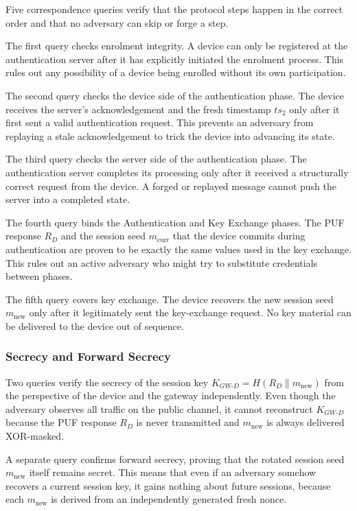 \documentclass[conference]{IEEEtran}
\begin{document}
Five correspondence queries verify that the protocol steps happen in the correct
order and that no adversary can skip or forge a step.

The first query checks enrolment integrity.  A device can only be registered at
the authentication server after it has explicitly initiated the enrolment
process.  This rules out any possibility of a device being enrolled without
its own participation.

The second query checks the device side of the authentication phase.  The device
receives the server's acknowledgement and the fresh timestamp $ts_2$ only after
it first sent a valid authentication request.  This prevents an adversary from
replaying a stale acknowledgement to trick the device into advancing its state.

The third query checks the server side of the authentication phase.  The authentication
server completes its processing only after it received a structurally correct
request from the device.  A forged or replayed message cannot push the server
into a completed state.

The fourth query binds the Authentication and Key Exchange phases.  The PUF response $R_D$ and
the session seed $m_{\mathrm{curr}}$ that the device commits during authentication are proven to be
exactly the same values used in the key exchange.  This rules out an active
adversary who might try to substitute credentials between phases.

The fifth query covers key exchange.  The device recovers the new session seed
$m_{\mathrm{new}}$ only after it legitimately sent the key-exchange request.
No key material can be delivered to the device out of sequence.

\subsubsection{Secrecy and Forward Secrecy}

Two queries verify the secrecy of the session key
$K_{GW\text{-}D} = H(R_D \| m_{\mathrm{new}})$ from the perspective of the
device and the gateway independently.  Even though the adversary observes all
traffic on the public channel, it cannot reconstruct $K_{GW\text{-}D}$
because the PUF response $R_D$ is never transmitted and
$m_{\mathrm{new}}$ is always delivered XOR-masked.

A separate query confirms forward secrecy, proving that the rotated session seed
$m_{\mathrm{new}}$ itself remains secret.  This means that even if an
adversary somehow recovers a current session key, it gains nothing about
future sessions, because each $m_{\mathrm{new}}$ is derived from an
independently generated fresh nonce.
\end{document}
